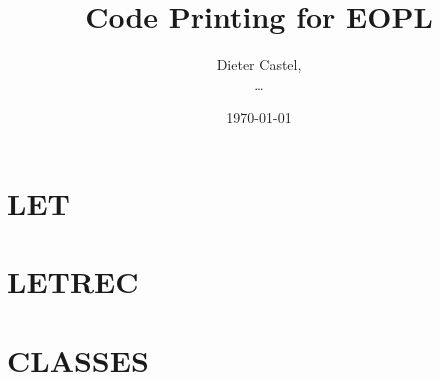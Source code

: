 \documentclass[11pt,a4paper,twoside]{article}
\title{Code Printing for EOPL}
\date{\today}
\author{Dieter Castel, \\ \ldots}
\begin{document}
\maketitle
\tableofcontents
\section{LET}


\section{LETREC}


\section{CLASSES}

\end{document}
